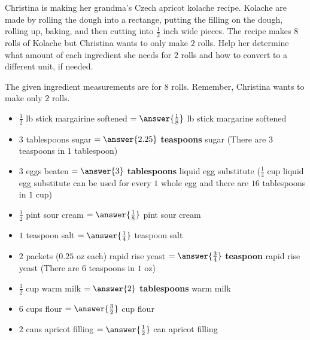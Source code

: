 \documentclass{ximera}
\author{Carolyn Johns}
\begin{document}
\begin{exercise}
Christina is making her grandma's Czech apricot kolache recipe. Kolache are made by rolling the dough into a rectange, putting the filling on the dough, rolling up, baking, and then cutting into $\frac{1}{2}$ inch wide pieces. The recipe makes $8$ rolls of Kolache but Christina wants to only make $2$ rolls. Help her determine what amount of each ingredient she needs for $2$ rolls and how to convert to a different unit, if needed.

The given ingredient measurements are for $8$ rolls.  Remember, Christina wants to make only $2$ rolls.

\begin{itemize}

\item $\frac{1}{2}$ lb stick margairine softened $= \answer{\frac{1}{8}}$ lb stick margarine softened
\item $3$ tablespoons sugar $= \answer{2.25}$ \textbf{teaspoons} sugar (There are $3$ teaspoons in $1$ tablespoon)
\item $3$ eggs beaten $= \answer{3}$ \textbf{tablespoons} liquid egg substitute ($\frac{1}{4}$ cup liquid egg substitute can be used for every $1$ whole egg and there are $16$ tablespoons in $1$ cup) 
\item $\frac{1}{2}$ pint sour cream $= \answer{\frac{1}{8}}$ pint sour cream
\item $1$ teaspoon salt $= \answer{\frac{1}{4}}$ teaspoon salt
\item $2$ packets ($0.25$ oz each) rapid rise yeast $= \answer{\frac{3}{4}}$ \textbf{teaspoon} rapid rise yeast (There are $6$ teaspoons in $1$ oz)
\item $\frac{1}{2}$ cup warm milk  $= \answer{2}$ \textbf{tablespoons} warm milk
\item $6$ cups flour  $= \answer{\frac{3}{2}}$ cup flour 
\item $2$ cans apricot filling $= \answer{\frac{1}{2}}$ can apricot filling 

\end{itemize}

\end{exercise}
\end{document}
